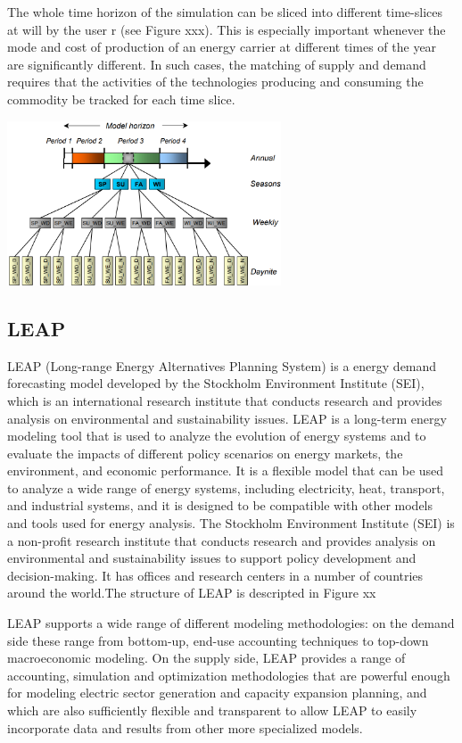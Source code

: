 \documentclass[lettersize,journal]{IEEEtran}
\begin{document}
  The whole time horizon of the simulation can be sliced into different time-slices at will by the user r (see Figure xxx). This is especially important whenever the mode and cost of production of an energy carrier at different times of the year are significantly different.  In such cases, the matching of supply and demand requires that the activities of the technologies producing and consuming the commodity be tracked for each time slice.\cite{times-docu}

  \includegraphics[width=3.2in]{time_horizon.png}

  \subsection{LEAP}

  LEAP (Long-range Energy Alternatives Planning System) is a energy demand forecasting model developed by the Stockholm Environment Institute (SEI), which is an international research institute that conducts research and provides analysis on environmental and sustainability issues. LEAP is a long-term energy modeling tool that is used to analyze the evolution of energy systems and to evaluate the impacts of different policy scenarios on energy markets, the environment, and economic performance. It is a flexible model that can be used to analyze a wide range of energy systems, including electricity, heat, transport, and industrial systems, and it is designed to be compatible with other models and tools used for energy analysis. The Stockholm Environment Institute (SEI) is a non-profit research institute that conducts research and provides analysis on environmental and sustainability issues to support policy development and decision-making. It has offices and research centers in a number of countries around the world.The structure of LEAP is descripted in Figure xx


  LEAP supports a wide range of different modeling methodologies: on the demand side these range from bottom-up, end-use accounting techniques to top-down macroeconomic modeling. On the supply side, LEAP provides a range of accounting, simulation and optimization methodologies that are powerful enough for modeling electric sector generation and capacity expansion planning, and which are also sufficiently flexible and transparent to allow LEAP to easily incorporate data and results from other more specialized models.
\end{document}
